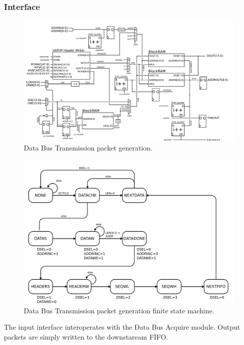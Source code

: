 \subsubsection{Interface}
\begin{figure}
\begin{centering}
\includegraphics[scale=0.8]{data.packetgen.svg}
\end{centering}
\caption{Data Bus Transmission packet generation.}
\label{data.packetgen}
\end{figure}

\begin{figure}
\begin{centering}
\includegraphics[scale=0.8]{data.packetgen.fsm.svg}
\end{centering}
\caption{Data Bus Transmission packet generation finite state machine.}
\label{data.packetgen.fsm}
\end{figure}

The input interface interoperates with the Data Bus Acquire module.
Output packets are simply written to the downstaream FIFO. 



